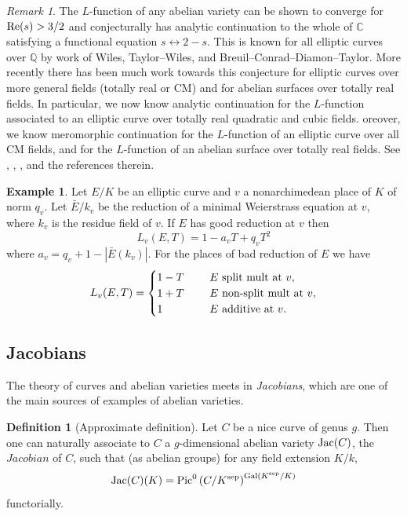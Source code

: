 \documentclass[12pt]{amsart}
\numberwithin{equation}{section}
\theoremstyle{remark}
\newtheorem{remark}[equation]{Remark}
\theoremstyle{definition}
\newtheorem{example}[equation]{Example}
\theoremstyle{definition}
\theoremstyle{definition}
\newtheorem{defi}[equation]{Definition}
\theoremstyle{definition}
\theoremstyle{definition}
\theoremstyle{definition}
\begin{document}
\begin{remark}
The $L$-function of any abelian variety can be shown to converge for $\textup{Re}(s)>3/2$ and conjecturally has analytic continuation to the whole of $\mathbb{C}$ satisfying a functional equation $s\leftrightarrow 2-s$. This is known for all elliptic curves over $\mathbb{Q}$ by work of Wiles, Taylor--Wiles, and Breuil--Conrad--Diamon--Taylor. More recently there has been much work towards this conjecture for elliptic curves over more general fields (totally real or CM) and for abelian surfaces over totally real fields. In particular, we now know analytic continuation for the $L$-function associated to an elliptic curve over totally real quadratic and cubic fields. oreover, we know meromorphic continuation for the $L$-function of an elliptic curve over all CM fields, and for the $L$-function of an abelian surface over totally real fields. See \cite{MR3359051},  \cite{DNS2019}, \cite{ACCGHLNSTT2018}, \cite{BCGP2018} and the references therein.
\end{remark}

\begin{example}
Let $E/K$ be an elliptic curve and $v$ a nonarchimedean place of $K$ of norm $q_v$. Let $\bar{E}/k_v$ be the reduction of a minimal Weierstrass equation at $v$, where $k_v$ is the residue field of $v$. If $E$ has good reduction at $v$ then  
\[L_v(E,T)=1-a_vT+q_vT^2\]
where $a_v=q_v+1-|\bar{E}(k_v)|$. For the places of bad reduction of $E$ we have
\[L_v(E,T)=\begin{cases}1-T~~&~~E\textup{ split mult at }v,\\ 
1+T~~&~~E\textup{ non-split mult at }v,\\ 1~~&~~ E\textup{ additive at }v.\end{cases}\]
\end{example}




\subsection{Jacobians}

The theory of curves and abelian varieties meets in \textit{Jacobians}, which are one of the main sources of examples of abelian varieties.

\begin{defi}[Approximate definition]
Let $C$ be a nice curve of genus $g$. Then one can naturally associate to $C$ a $g$-dimensional abelian variety $\textup{Jac}(C)$, the $\textit{Jacobian}$ of $C$, such that (as abelian groups) for any field extension $K/k$,
\[\textup{Jac}(C)(K)=\textup{Pic}^0\left(C/K^\textup{sep}\right)^{\textup{Gal}(K^\textup{sep}/K)}\]
functorially.
\end{defi}
\end{document}
